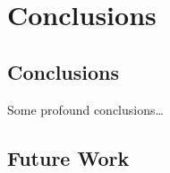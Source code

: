\documentclass[12pt,phd,lfcs,twoside,openright,logo,leftchapter,normalheadings]{infthesis}
\theoremstyle{plain}
\theoremstyle{definition}
\begin{document}
\part{Conclusions}

\chapter{Conclusions}
\label{ch:conclusions}
Some profound conclusions\dots

\chapter{Future Work}
\label{ch:future-work}


\singlespace



\end{document}

